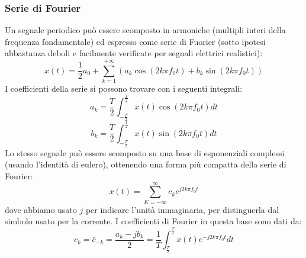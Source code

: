 \documentclass{article}
\begin{document}
\subsubsection{Serie di Fourier}
Un segnale periodico può essere scomposto in armoniche (multipli interi della frequenza fondamentale) ed espresso come serie di Fuorier (sotto ipotesi abbastanza deboli e facilmente verificate per segnali elettrici realistici):
$$ x(t) = \frac{1}{2}a_0+\sum_{k=1}^{+\infty}(a_k\cos(2k\pi f_0t)+ b_k\sin(2k\pi f_0t)) $$
I coefficienti della serie si possono trovare con i seguenti integrali:
$$ a_k = \frac{T}{2}\int_{-\frac{T}{2}}^{\frac{T}{2}}x(t)\cos(2k\pi f_0t)dt $$
$$ b_k = \frac{T}{2}\int_{-\frac{T}{2}}^{\frac{T}{2}}x(t)\sin(2k\pi f_0t)dt $$
Lo stesso segnale può essere scomposto su una base di esponenziali complessi (usando l'identità di eulero), ottenendo una forma più compatta della serie di Fourier:
$$ x(t) = \sum_{K=-\infty}^{\infty}c_ke^{j2k\pi f_0t} $$
dove abbiamo usato $j$ per indicare l'unità immaginaria, per distinguerla dal simbolo usato per la corrente. I coefficienti di Fourier in questa base sono dati da:
$$ c_k=\bar{c}_{-k}=\frac{a_k-jb_k}{2}=\frac{1}{T}\int_{\frac{T}{2}}^{\frac{T}{2}}x(t)e^{-j2k\pi f_0t}dt $$
\end{document}
